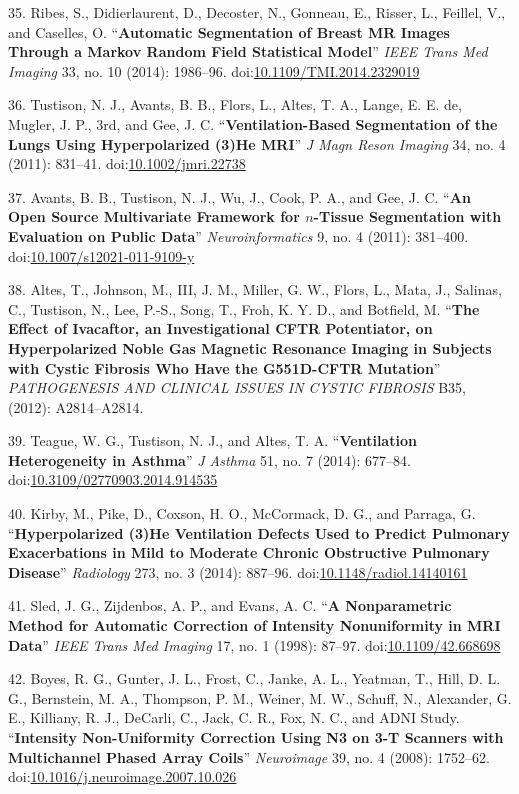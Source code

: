 \documentclass[11pt,]{article}
\begin{document}
35. Ribes, S., Didierlaurent, D., Decoster, N., Gonneau, E., Risser, L.,
Feillel, V., and Caselles, O. ``\textbf{Automatic Segmentation of Breast
MR Images Through a Markov Random Field Statistical Model}'' \emph{IEEE
Trans Med Imaging} 33, no. 10 (2014): 1986--96.
doi:\href{http://dx.doi.org/10.1109/TMI.2014.2329019}{10.1109/TMI.2014.2329019}

36. Tustison, N. J., Avants, B. B., Flors, L., Altes, T. A., Lange, E.
E. de, Mugler, J. P., 3rd, and Gee, J. C. ``\textbf{Ventilation-Based
Segmentation of the Lungs Using Hyperpolarized (3)He MRI}'' \emph{J Magn
Reson Imaging} 34, no. 4 (2011): 831--41.
doi:\href{http://dx.doi.org/10.1002/jmri.22738}{10.1002/jmri.22738}

37. Avants, B. B., Tustison, N. J., Wu, J., Cook, P. A., and Gee, J. C.
``\textbf{An Open Source Multivariate Framework for $n$-Tissue
Segmentation with Evaluation on Public Data}'' \emph{Neuroinformatics}
9, no. 4 (2011): 381--400.
doi:\href{http://dx.doi.org/10.1007/s12021-011-9109-y}{10.1007/s12021-011-9109-y}

38. Altes, T., Johnson, M., III, J. M., Miller, G. W., Flors, L., Mata,
J., Salinas, C., Tustison, N., Lee, P.-S., Song, T., Froh, K. Y. D., and
Botfield, M. ``\textbf{The Effect of Ivacaftor, an Investigational CFTR
Potentiator, on Hyperpolarized Noble Gas Magnetic Resonance Imaging in
Subjects with Cystic Fibrosis Who Have the G551D-CFTR Mutation}''
\emph{PATHOGENESIS AND CLINICAL ISSUES IN CYSTIC FIBROSIS} B35, (2012):
A2814--A2814.

39. Teague, W. G., Tustison, N. J., and Altes, T. A.
``\textbf{Ventilation Heterogeneity in Asthma}'' \emph{J Asthma} 51, no.
7 (2014): 677--84.
doi:\href{http://dx.doi.org/10.3109/02770903.2014.914535}{10.3109/02770903.2014.914535}

40. Kirby, M., Pike, D., Coxson, H. O., McCormack, D. G., and Parraga,
G. ``\textbf{Hyperpolarized (3)He Ventilation Defects Used to Predict
Pulmonary Exacerbations in Mild to Moderate Chronic Obstructive
Pulmonary Disease}'' \emph{Radiology} 273, no. 3 (2014): 887--96.
doi:\href{http://dx.doi.org/10.1148/radiol.14140161}{10.1148/radiol.14140161}

41. Sled, J. G., Zijdenbos, A. P., and Evans, A. C. ``\textbf{A
Nonparametric Method for Automatic Correction of Intensity Nonuniformity
in MRI Data}'' \emph{IEEE Trans Med Imaging} 17, no. 1 (1998): 87--97.
doi:\href{http://dx.doi.org/10.1109/42.668698}{10.1109/42.668698}

42. Boyes, R. G., Gunter, J. L., Frost, C., Janke, A. L., Yeatman, T.,
Hill, D. L. G., Bernstein, M. A., Thompson, P. M., Weiner, M. W.,
Schuff, N., Alexander, G. E., Killiany, R. J., DeCarli, C., Jack, C. R.,
Fox, N. C., and ADNI Study. ``\textbf{Intensity Non-Uniformity
Correction Using N3 on 3-T Scanners with Multichannel Phased Array
Coils}'' \emph{Neuroimage} 39, no. 4 (2008): 1752--62.
doi:\href{http://dx.doi.org/10.1016/j.neuroimage.2007.10.026}{10.1016/j.neuroimage.2007.10.026}
\end{document}
